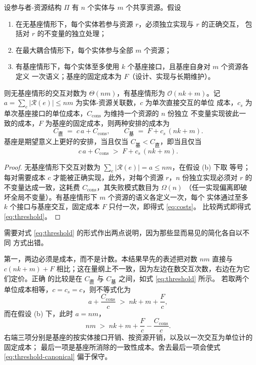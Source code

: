 \begin{theorem}[集成成本]\label{th:integration}
设参与者-资源结构 $\Pi$ 有 $n$ 个实体与 $m$ 个共享资源。假设
\begin{enumerate}[label=(\alph*)]
\item 在无基座情形下，每个实体若参与资源 $r$，必须独立实现与 $r$ 的正确交互，
      包括对 $r$ 的不变量的独立处理；
\item 在最大耦合情形下，每个实体参与全部 $m$ 个资源；
\item 有基座情形下，每个实体至多使用 $k$ 个基座接口，且基座自身对 $m$ 个资源各定义
      一次语义；基座的固定成本为 $F$（设计、实现与长期维护）。
\end{enumerate}
则无基座情形的交互对数为 $\Theta(nm)$，有基座情形为 $\mathcal{O}(nk + m)$。记
$a = \sum_{e} |\mathcal{R}(e)| \le nm$ 为实体-资源关联数，$c$ 为单次直接交互的单位
成本，$c_s$ 为单次基座接口的单位成本，$C_{\mathrm{cons}}$ 为维持一个资源的 $n$ 份独立
不变量实现彼此一致的成本，$F$ 为基座的固定成本，则两种安排的成本为
\begin{equation}\label{eq:costs}
C_{\text{直}} \;=\; c\,a + C_{\mathrm{cons}},
\qquad
C_{\text{基}} \;=\; F + c_s\,(n k + m).
\end{equation}
基座是期望意义上更好的安排，当且仅当
$C_{\text{基}} < C_{\text{直}}$，即当且仅当
\begin{equation}\label{eq:threshold}
c\,a + C_{\mathrm{cons}} \;>\; F + c_s\,(n k + m).
\end{equation}
\end{theorem}

\begin{proof}
无基座情形下交互对数为 $\sum_{e} |\mathcal{R}(e)| = a \le nm$，在假设 (b) 下取
等号；每对需要成本 $c$ 才能被正确实现，此外，对每个资源 $r$，$n$ 份独立实现必须对
$r$ 的不变量达成一致，这耗费 $C_{\mathrm{cons}}$，其失败模式数目为 $\Omega(n)$
（任一实现偏离即破坏全局不变量）。有基座情形下 $m$ 个资源的语义各定义一次，每个
实体通过至多 $k$ 个接口与基座交互，固定成本 $F$ 只付一次，即得式 \eqref{eq:costs}。
比较两式即得式 \eqref{eq:threshold}。
\end{proof}

需要对式 \eqref{eq:threshold} 的形式作出两点说明，因为那些显而易见的简化各自以不同
方式出错。

第一，两边必须是成本，而不是计数。本结果早先的表述把对数 $nm$ 直接与
$c(nk+m) + F$ 相比；这在量纲上不一致，因为左边在数交互次数，右边在为它们定价。正确
的比较是在 $C_{\text{直}}$ 与 $C_{\text{基}}$ 之间，如式 \eqref{eq:threshold} 所示。
若取两个单位成本相等，$c = c_s = c$，则不等式化为
\begin{equation}\label{eq:threshold-equal}
a + \frac{C_{\mathrm{cons}}}{c} \;>\; n k + m + \frac{F}{c},
\end{equation}
而在假设 (b) 下，此时 $a = nm$，
\begin{equation}\label{eq:threshold-canonical}
n m \;>\; n k + m + \frac{F}{c} - \frac{C_{\mathrm{cons}}}{c}.
\end{equation}
右端三项分别是基座的按实体接口开销、按资源开销，以及以一次交互为单位计的固定成本；
最后一项是基座所消除的一致性成本。舍去最后一项会使式 \eqref{eq:threshold-canonical}
偏于保守。

